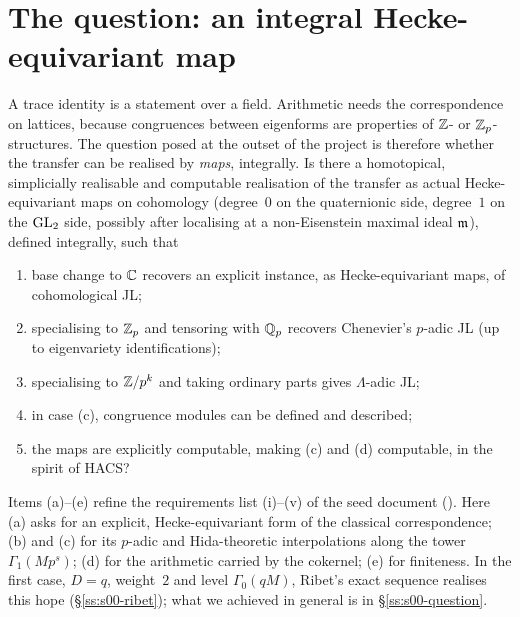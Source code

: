 \section{The question: an integral Hecke-equivariant map}\label{ss:s00-hope}

A trace identity is a statement over a field. Arithmetic needs the correspondence on lattices, because congruences between
eigenforms are properties of $\mathbb{Z}$- or $\mathbb{Z}_p$-structures. The question posed at the outset of the project is therefore whether the
transfer can be realised by \emph{maps}, integrally. Is there a homotopical, simplicially realisable and computable realisation of the
transfer as actual Hecke-equivariant maps on cohomology (degree~$0$ on the quaternionic side, degree~$1$ on the $\mathrm{GL}_2$ side,
possibly after localising at a non-Eisenstein maximal ideal $\mathfrak{m}$), defined integrally, such that
\begin{enumerate}[label=(\alph*)]
\item base change to $\mathbb{C}$ recovers an explicit instance, as Hecke-equivariant maps, of cohomological JL;
\item specialising to $\mathbb{Z}_p$ and tensoring with $\mathbb{Q}_p$ recovers Chenevier's $p$-adic JL (up to eigenvariety identifications);
\item specialising to $\mathbb{Z}/p^k$ and taking ordinary parts gives $\Lambda$-adic JL;
\item in case (c), congruence modules can be defined and described;
\item the maps are explicitly computable, making (c) and (d) computable, in the spirit of HACS?
\end{enumerate}
Items (a)--(e) refine the requirements list (i)--(v) of the seed document ().
Here (a) asks for an explicit, Hecke-equivariant form of the classical correspondence; (b) and (c) for its $p$-adic and
Hida-theoretic interpolations along the tower $\Gamma_1(Mp^s)$; (d) for the arithmetic carried by the cokernel; (e) for finiteness.
In the first case, $D=q$, weight~$2$ and level $\Gamma_0(qM)$, Ribet's exact sequence realises this hope
(\S\ref{ss:s00-ribet}); what we achieved in general is in \S\ref{ss:s00-question}.

